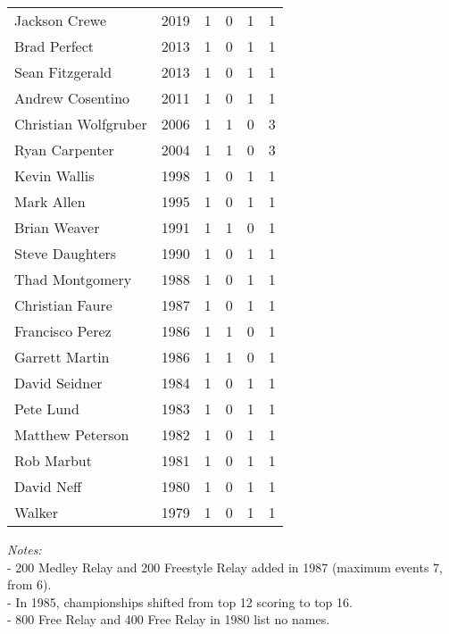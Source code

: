 \begin{longtable}{lccccc}
Jackson Crewe & 2019 & 1 & 0 & 1 & 1 \\
Brad Perfect & 2013 & 1 & 0 & 1 & 1 \\
Sean Fitzgerald & 2013 & 1 & 0 & 1 & 1 \\
Andrew Cosentino & 2011 & 1 & 0 & 1 & 1 \\
Christian Wolfgruber & 2006 & 1 & 1 & 0 & 3 \\
Ryan Carpenter & 2004 & 1 & 1 & 0 & 3 \\
Kevin Wallis & 1998 & 1 & 0 & 1 & 1 \\
Mark Allen & 1995 & 1 & 0 & 1 & 1 \\
Brian Weaver & 1991 & 1 & 1 & 0 & 1 \\
Steve Daughters & 1990 & 1 & 0 & 1 & 1 \\
Thad Montgomery & 1988 & 1 & 0 & 1 & 1 \\
Christian Faure & 1987 & 1 & 0 & 1 & 1 \\
Francisco Perez & 1986 & 1 & 1 & 0 & 1 \\
Garrett Martin & 1986 & 1 & 1 & 0 & 1 \\
David Seidner & 1984 & 1 & 0 & 1 & 1 \\
Pete Lund & 1983 & 1 & 0 & 1 & 1 \\
Matthew Peterson & 1982 & 1 & 0 & 1 & 1 \\
Rob Marbut & 1981 & 1 & 0 & 1 & 1 \\
David Neff & 1980 & 1 & 0 & 1 & 1 \\
Walker & 1979 & 1 & 0 & 1 & 1 \\
\bottomrule
\end{longtable}

\noindent\textit{Notes:} \\
- 200 Medley Relay and 200 Freestyle Relay added in 1987 (maximum events 7, from 6). \\
- In 1985, championships shifted from top 12 scoring to top 16. \\
- 800 Free Relay and 400 Free Relay in 1980 list no names.

